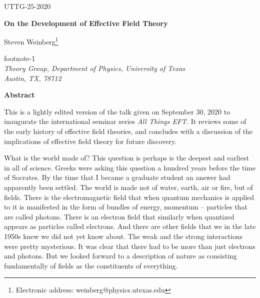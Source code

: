  


\def\fnote#1#2{\begingroup\def\thefootnote{#1}\footnote{#2}\addtocounter
{footnote}{-1}\endgroup}
\def\BM#1{\mbox{\boldmath{$#1$}}}

\def\gev{{\rm GeV}\,}
\def\check{{\bf Check:}~}





\hfill{UTTG-25-2020}








\begin{center}

{\bf On the Development of Effective Field Theory}

\vspace{20pt}

Steven Weinberg\fnote{*}{Electronic address:
weinberg@physics.utexas.edu}\\
{\em Theory Group, Department of Physics, University of
Texas\\
Austin, TX, 78712}

\vspace{20pt}

{\bf Abstract}

\end{center}





 This is a lightly edited version of the talk given on September 30, 2020 to inaugurate the international seminar series  {\it All Things EFT}.  It reviews some of the early history of effective field theories, and concludes with a discussion of the implications of effective field theory for future discovery.\\

\vspace{15pt}







What is the world made of?  This question  is  perhaps is the deepest and  earliest in all of science.  Greeks were asking this question a hundred years before the time of Socrates. By the time that I became a graduate student an answer had  apparently been settled.  The world is made not of water, earth, air or fire, but of fields. There is the electromagnetic field that when quantum mechanics is applied to it is manifested in the form of bundles of energy, momentum -- particles that are called photons. There is an electron field that similarly when quantized appears as particles called electrons. And there are other fields that we in the late 1950s knew we did not yet know about. The weak and the strong interactions were pretty mysterious. It was clear that there had to be more than just electrons and photons. But we looked forward to a description of nature as consisting fundamentally of fields as the constituents of everything. 

